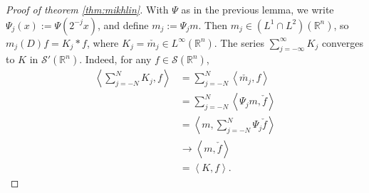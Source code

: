 \documentclass{book}
\newcommand{\scrS}{\mathscr{S}}
\newcommand{\bbR}{\mathbb{R}}
\newcommand{\angles}[1]{\left\langle {#1} \right\rangle}
\theoremstyle{definition}
\theoremstyle{remark}
\numberwithin{equation}{chapter}
\begin{document}
\begin{proof}[Proof of theorem \ref{thm:mikhlin}]
    With $\Psi$ as in the previous lemma, we write $\Psi_j(x) := \Psi(2^{-j} x)$, and define $m_j := \Psi_j m$. Then $m_j \in (L^1 \cap L^2)(\bbR^n)$, so $m_j(D)f = K_j \ast f$, where $K_j = \check{m_j} \in L^\infty(\bbR^n)$. The series $\sum_{j=-\infty}^\infty K_j$ converges to $K$ in $\scrS'(\bbR^n)$. Indeed, for any $f \in \scrS(\bbR^n)$,
    \begin{equation} \begin{aligned}
        \angles{ \sum_{j=-N}^N K_j, f }
        &= \sum_{j=-N}^N \angles{ \check{m_j},f } \\
        &= \sum_{j=-N}^N \angles{ \Psi_j m, \check{f} } \\
        &= \angles{ m, \sum_{j=-N}^N \Psi_j \check{f} } \\
        &\to \angles{ m, \check{f} } \\
        &= \angles{ K, f }.
    \end{aligned} \end{equation}
    

\end{proof}
\end{document}
